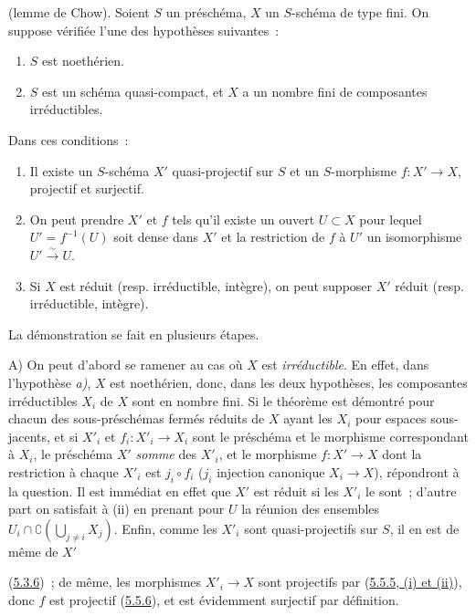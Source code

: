 \begin{theorem}[5.6.1]
\label{II.5.6.1-fr}
(lemme de Chow). Soient $S$ un préschéma, $X$ un $S$-schéma de type fini. On
suppose vérifiée l'une des hypothèses suivantes~:
\begin{enumerate}
  \item[\rm{a)}] $S$ est noethérien.
  \item[\rm{b)}] $S$ est un schéma quasi-compact, et $X$ a un nombre fini de
  composantes irréductibles.
\end{enumerate}
Dans ces conditions~:
\begin{enumerate}
  \item[\rm{(i)}] Il existe un $S$-schéma $X'$ \textup{quasi-projectif} sur $S$ et un
  $S$-morphisme $f:X'\to X$, \textup{projectif} et \textup{surjectif}.
  \item[\rm{(ii)}] On peut prendre $X'$ et $f$ tels qu'il existe un ouvert
  $U\subset X$ pour lequel $U'=f^{-1}(U)$ soit dense dans $X'$ et la
  restriction de $f$ à $U'$ un isomorphisme $U'\xrightarrow{\sim}U$.
  \item[\rm{(iii)}] Si $X$ est réduit \textup{(resp.} irréductible, intègre), on peut
  supposer $X'$ réduit \textup{(resp.} irréductible, intègre).
\end{enumerate}
\end{theorem}

La démonstration se fait en plusieurs étapes.

A) On peut d'abord se ramener au cas où $X$ est \emph{irréductible}. En effet, dans
l'hypothèse \emph{a)}, $X$ est noethérien, donc, dans les deux hypothèses, les
composantes irréductibles $X_i$ de $X$ sont en nombre fini. Si le théorème est
démontré pour chacun des sous-préschémas fermés réduits de $X$ ayant les $X_i$
pour espaces sous-jacents, et si $X'_i$ et $f_i:X'_i\to X_i$ sont le préschéma
et le morphisme correspondant à $X_i$, le préschéma $X'$ \emph{somme} des $X'_i$, et
le morphisme $f:X'\to X$ dont la restriction à chaque $X'_i$ est $j_i\circ f_i$
($j_i$ injection canonique $X_i\to X$), répondront à la question. Il est
immédiat en effet que $X'$ est réduit si les $X'_i$ le sont~; d'autre part on
satisfait à (ii) en prenant pour $U$ la réunion des ensembles
$U_i\cap\complement(\bigcup_{j\neq i}X_j)$. Enfin, comme les $X'_i$ sont
quasi-projectifs sur $S$, il en est de même de $X'$


(\hyperref[II.5.3.6-fr]{5.3.6})~; de même, les morphismes $X'_i\to X$ sont
projectifs par (\hyperref[II.5.5.5-fr]{5.5.5, (i) et (ii)}), donc $f$ est
projectif (\hyperref[II.5.5.6-fr]{5.5.6}), et est évidemment surjectif par
définition.

